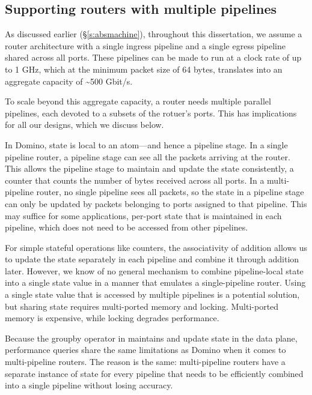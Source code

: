 \subsection{Supporting routers with multiple pipelines}
\label{ss:multiple_pipelines}

As discussed earlier (\S\ref{s:absmachine}), throughout this dissertation, we
assume a router architecture with a single ingress pipeline and a single egress
pipeline shared across all ports. These pipelines can be made to run at a clock
rate of up to 1 GHz, which at the minimum packet size of 64 bytes, translates
into an aggregate capacity of \textasciitilde500 Gbit/s.

To scale beyond this aggregate capacity, a router needs multiple parallel
pipelines, each devoted to a subsets of the rotuer's ports. This has
implications for all our designs, which we discuss below.

 In Domino, state is local to an atom---and hence a pipeline
stage.  In a single pipeline router, a pipeline stage can see all the packets
arriving at the router. This allows the pipeline stage to maintain and update
the state consistently, \eg a counter that counts the number of bytes received
across all ports. In a multi-pipeline router, no single pipeline sees all
packets, so the state in a pipeline stage can only be updated by packets
belonging to ports assigned to that pipeline. This may suffice for some
applications, \eg per-port state that is maintained in each pipeline, which
does not need to be accessed from  other pipelines. 

For simple stateful operations like counters, the associativity of addition
allows us to update the state separately in each pipeline and combine it
through addition later. However, we know of no general mechanism to combine
pipeline-local state into a single state value in a manner that emulates a
single-pipeline router. Using a single state value that is accessed by multiple
pipelines is a potential solution, but sharing state requires multi-ported
memory and locking. Multi-ported memory is expensive, while locking degrades
performance.

 Because the {\ct groupby} operator in \TheSystem
maintains and update state in the data plane, performance queries share the
same limitations as Domino when it comes to multi-pipeline routers. The reason
is the same: multi-pipeline routers have a separate instance of state for every
pipeline that needs to be efficiently combined into a single pipeline without
losing accuracy.

